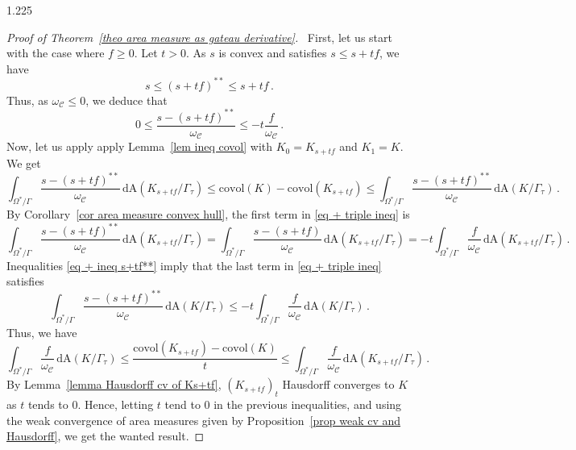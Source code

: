 \documentclass[reqno, a4paper]{amsart}
\numberwithin{equation}{section}
\numberwithin{figure}{section}
\theoremstyle{definition}
\theoremstyle{remark}
\newcommand{\dif}{\mathrm{d}} %
\newcommand{\C}{\mathcal{C}} %
\newcommand{\covol}{\mathrm{covol}} %
\newcommand{\Area}{\mathrm{A}} %
\begin{document}
\begin{spacing}{1.225}
\begin{proof}[Proof of Theorem~\ref{theo area measure as gateau derivative}]
\noindent \textbullet\ First, let us start with the case where $f \geq 0$. Let $t>0$. As $s$ is convex and satisfies $s \leq s+tf$, we have 
\begin{equation*}
 s \leq (s+tf)^{**} \leq s+tf \, . 
\end{equation*}
Thus, as $\omega_\C \leq 0$, we deduce that 
\begin{equation}
\label{eq + ineq s+tf**}
0 \leq \frac{s - (s+tf)^{**}}{\omega_\C} \leq -t\frac{f}{\omega_\C} \, . 
\end{equation}
Now, let us apply apply Lemma~\ref{lem ineq covol} with $K_0=K_{s+tf}$ and $K_1= K$. We get
\begin{equation}
\label{eq + triple ineq}
 \int_{\Omega^*/\Gamma} \frac{s - (s+tf)^{**}}{\omega_\C} \,\dif \Area(K_{s+tf}/\Gamma_\tau) \leq \covol(K) - \covol(K_{s+tf}) \leq \int_{\Omega^*/\Gamma} \frac{s - (s+tf)^{**}}{\omega_\C} \,\dif \Area(K/\Gamma_\tau) \, . 
 \end{equation}
By Corollary~\ref{cor area measure convex hull}, the first term in \eqref{eq + triple ineq} is 
\begin{equation*}
\int_{\Omega^*/\Gamma} \frac{s - (s+tf)^{**}}{\omega_\C} \,\dif \Area(K_{s+tf}/\Gamma_\tau) = \int_{\Omega^*/\Gamma} \frac{s - (s+tf)}{\omega_\C} \,\dif \Area(K_{s+tf}/\Gamma_\tau) = -t \int_{\Omega^*/\Gamma} \frac{f}{\omega_\C} \,\dif \Area(K_{s+tf}/\Gamma_\tau) \, . 
\end{equation*}
Inequalities \eqref{eq + ineq s+tf**} imply that the last term in \eqref{eq + triple ineq} satisfies
\begin{equation*}
\int_{\Omega^*/\Gamma} \frac{s - (s+tf)^{**}}{\omega_\C} \,\dif \Area(K/\Gamma_\tau) \leq -t \int_{\Omega^*/\Gamma} \frac{f}{\omega_\C} \,\dif \Area(K/\Gamma_\tau) \, . 
\end{equation*}
Thus, we have 
\begin{equation*}
\int_{\Omega^*/\Gamma} \frac{f}{\omega_\C} \, \dif \Area(K/\Gamma_\tau) \leq \frac{\covol (K_{s+tf})-\covol(K)}{t} \leq \int_{\Omega^*/\Gamma} \frac{f}{\omega_\C} \, \dif \Area(K_{s+tf}/\Gamma_\tau) \, . 
\end{equation*}
By Lemma~\ref{lemma Hausdorff cv of Ks+tf}, $(K_{s+tf})_t$ Hausdorff converges to $K$ as $t$ tends to $0$. Hence, letting $t$ tend to $0$ in the previous inequalities, and using the weak convergence of area measures given by Proposition~\ref{prop weak cv and Hausdorff}, we get the wanted result. 


\end{proof}
\end{spacing}
\end{document}
